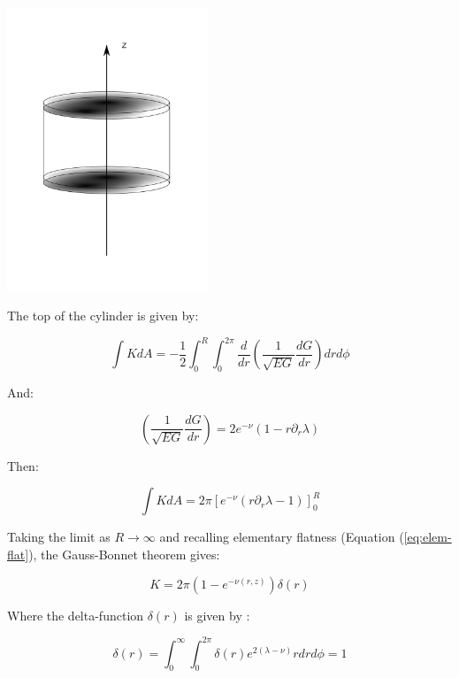 \documentclass{article}
\begin{document}
\begin{center}
\includegraphics[width=60mm]{Figure3.png}
\end{center}

The top of the cylinder is given by:

\begin{equation}
\int KdA=-\frac{1}{2}\int^{R}_{0}\int^{2\pi}_{0}\frac{d}{dr}\left(\frac{1}{\sqrt{EG}}\frac{dG}{dr}\right)drd\phi
\end{equation}

And:

\begin{equation}
\left(\frac{1}{\sqrt{EG}}\frac{dG}{dr}\right)=2e^{-\nu}\left(1-r\partial_{r}\lambda\right)
\end{equation}

Then:

\begin{equation}
\int KdA=2\pi[e^{-\nu}\left(r\partial_{r}\lambda-1\right)]^{R}_{0}
\end{equation}

Taking the limit as $R\rightarrow\infty$ and recalling elementary flatness (Equation (\ref{eq:elem-flat}), the Gauss-Bonnet theorem gives:

\begin{equation}
K=2\pi\left(1-e^{-\nu (r,z)}\right)\delta(r)
\end{equation}

Where the delta-function $\delta(r)$ is given by \cite{araujo_static_1995}:

\begin{equation}
\delta(r)=\int^{\infty}_{0} \int^{2\pi}_{0} \delta (r)e^{2\left(\lambda-\nu\right)}rdrd\phi =1
\end{equation} 
\end{document}
